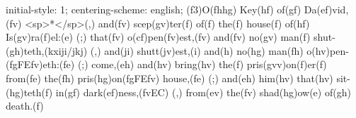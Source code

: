 initial-style: 1;
centering-scheme: english;
(f3)O(fhhg) Key(hf) of(gf) Da(ef)vid,(fv) <sp>*</sp>(,) and(fv) scep(gv)ter(f) of(f) the(f) house(f) of(hf) Is(gv)ra(f)el:(e) (;) that(fv) o(cf)pen(fv)est,(fv) and(fv) no(gv) man(f) shut-(gh)teth,(kxiji/jkj) (,) and(ji) shutt(jv)est,(i) and(h) no(hg) man(fh) o(hv)pen-(fgFEfv)eth:(fe) (;) come,(eh) and(hv) bring(hv) the(f) pris(gvv)on(f)er(f) from(fe) the(fh) pris(hg)on(fgFEfv) house,(fe) (;) and(eh) him(hv) that(hv) sit-(hg)teth(f) in(gf) dark(ef)ness,(fvEC) (,) from(ev) the(fv) shad(hg)ow(e) of(gh) death.(f)
